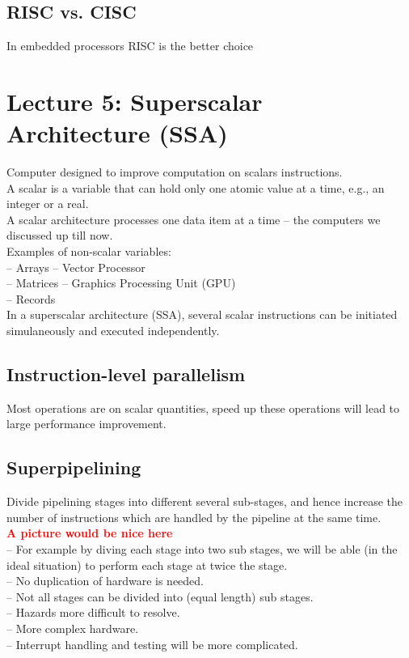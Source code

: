 \documentclass[titlepage, a4paper]{article}
\newcommand{\todo}[1] {\textbf{\textcolor{red}{#1}}}
\begin{document}
\subsection{RISC vs. CISC}
In embedded processors RISC is the better choice

\section{Lecture 5: Superscalar Architecture (SSA)}
Computer designed to improve computation on scalars instructions. \\
A scalar is a variable that can hold only one atomic value at a time, e.g., an integer or a real. \\
A scalar architecture processes one data item at a time -- the computers we discussed up till now. \\
Examples of non-scalar variables: \\
-- Arrays -- Vector Processor \\
-- Matrices -- Graphics Processing Unit (GPU) \\
-- Records \\

In a superscalar architecture (SSA), several scalar instructions can be initiated simulaneously and executed independently.

\subsection{Instruction-level parallelism}
Most operations are on scalar quantities, speed up these operations will lead to large performance improvement.

\subsection{Superpipelining}
Divide pipelining stages into different several sub-stages, and hence increase the number of instructions which are handled by the pipeline at the same time. \\
\todo{A picture would be nice here} \\

-- For example by diving each stage into two sub stages, we will be able (in the ideal situation) to perform each stage at twice the stage. \\
-- No duplication of hardware is needed. \\
-- Not all stages can be divided into (equal length) sub stages. \\
-- Hazards more difficult to resolve. \\
-- More complex hardware. \\
-- Interrupt handling and testing will be more complicated. \\
\end{document}
